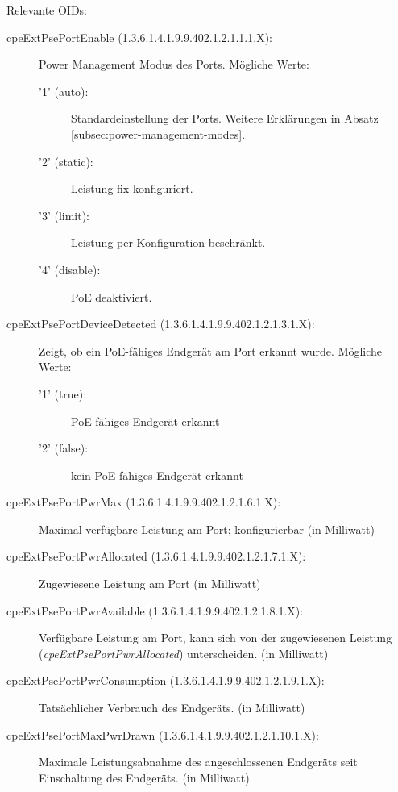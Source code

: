 Relevante OIDs:
\begin{description}
\item[cpeExtPsePortEnable (1.3.6.1.4.1.9.9.402.1.2.1.1.1.X):] Power Management Modus des Ports.
M\"ogliche Werte:
\begin{description}
\item ['1' (auto):] Standardeinstellung der Ports. Weitere Erkl\"arungen in Absatz \ref{subsec:power-management-modes}.
\item ['2' (static):] Leistung fix konfiguriert.
\item ['3' (limit):] Leistung per Konfiguration beschr\"ankt.
\item ['4' (disable):] PoE deaktiviert.
\end{description}

\item[cpeExtPsePortDeviceDetected (1.3.6.1.4.1.9.9.402.1.2.1.3.1.X):] Zeigt, ob ein PoE-f\"ahiges Endger\"at am Port erkannt wurde.
M\"ogliche Werte:
\begin{description}
\item ['1' (true):] PoE-f\"ahiges Endger\"at erkannt
\item ['2' (false):] kein PoE-f\"ahiges Endger\"at erkannt
\end{description}

\item[cpeExtPsePortPwrMax (1.3.6.1.4.1.9.9.402.1.2.1.6.1.X):] Maximal verf\"ugbare Leistung am Port; konfigurierbar (in Milliwatt)
\item[cpeExtPsePortPwrAllocated (1.3.6.1.4.1.9.9.402.1.2.1.7.1.X):] Zugewiesene Leistung am Port (in Milliwatt)
\item[cpeExtPsePortPwrAvailable (1.3.6.1.4.1.9.9.402.1.2.1.8.1.X):] Verf\"ugbare Leistung am Port, kann sich von der zugewiesenen Leistung (\emph{cpeExtPsePortPwrAllocated}) unterscheiden. (in Milliwatt)
\item[cpeExtPsePortPwrConsumption (1.3.6.1.4.1.9.9.402.1.2.1.9.1.X):] Tats\"achlicher Verbrauch des Endger\"ats. (in Milliwatt)
\item[cpeExtPsePortMaxPwrDrawn (1.3.6.1.4.1.9.9.402.1.2.1.10.1.X):] Maximale Leistungsabnahme des angeschlossenen Endger\"ats seit Einschaltung des Endger\"ats. (in Milliwatt)

\end{description}





